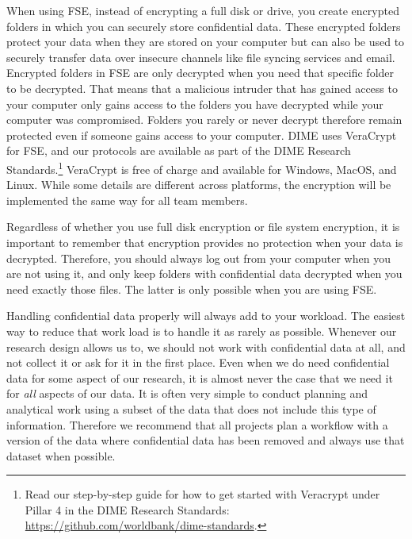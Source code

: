 \documentclass[
]{book}
\begin{document}
When using FSE, instead of encrypting a full disk or drive,
you create encrypted folders
in which you can securely store confidential data.
These encrypted folders protect your data
when they are stored on your computer
but can also be used to securely transfer data over
insecure channels like file syncing services and email.
Encrypted folders in FSE are only decrypted
when you need that specific folder to be decrypted.
That means that a malicious intruder
that has gained access to your computer
only gains access to the folders you have decrypted
while your computer was compromised.
Folders you rarely or never decrypt therefore
remain protected even if someone gains access to your computer.
DIME uses VeraCrypt for FSE, and
our protocols are available as part of the DIME Research Standards.\footnote{Read our step-by-step guide for how to get started with Veracrypt
  under Pillar 4 in the DIME Research Standards:
  \url{https://github.com/worldbank/dime-standards}.}
VeraCrypt is free of charge and available for Windows, MacOS, and Linux.
While some details are different across platforms,
the encryption will be implemented the same way for all team members.

Regardless of whether you use full disk encryption or file system encryption,
it is important to remember that encryption provides no protection
when your data is decrypted.
Therefore, you should always log out from your computer when you are not using it,
and only keep folders with confidential data decrypted when you need exactly those files.
The latter is only possible when you are using FSE.

Handling confidential data properly will always add to your workload.
The easiest way to reduce that work load is to
handle it as rarely as possible.
Whenever our research design allows us to,
we should not work with confidential data at all,
and not collect it or ask for it in the first place.
Even when we do need confidential data for some aspect of our research,
it is almost never the case that we need it for \emph{all} aspects of our data.
It is often very simple to conduct planning and analytical work
using a subset of the data that does not include this type of information.
Therefore we recommend that all projects plan a workflow
with a version of the data where confidential data has been removed
and always use that dataset when possible.
\end{document}
